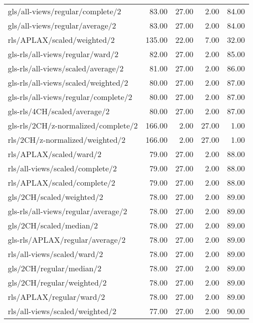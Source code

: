 \begin{longtable}{lrrrr}
    gls/all-views/regular/complete/2          &  83.00 & 27.00 &  2.00 & 84.00 \\
    gls/all-views/regular/average/2           &  83.00 & 27.00 &  2.00 & 84.00 \\
    rls/APLAX/scaled/weighted/2               & 135.00 & 22.00 &  7.00 & 32.00 \\
    gls-rls/all-views/regular/ward/2          &  82.00 & 27.00 &  2.00 & 85.00 \\
    gls-rls/all-views/scaled/average/2        &  81.00 & 27.00 &  2.00 & 86.00 \\
    gls-rls/all-views/scaled/weighted/2       &  80.00 & 27.00 &  2.00 & 87.00 \\
    gls-rls/all-views/regular/complete/2      &  80.00 & 27.00 &  2.00 & 87.00 \\
    gls-rls/4CH/scaled/average/2              &  80.00 & 27.00 &  2.00 & 87.00 \\
    gls-rls/2CH/z-normalized/complete/2       & 166.00 &  2.00 & 27.00 &  1.00 \\
    rls/2CH/z-normalized/weighted/2           & 166.00 &  2.00 & 27.00 &  1.00 \\
    rls/APLAX/scaled/ward/2                   &  79.00 & 27.00 &  2.00 & 88.00 \\
    rls/all-views/scaled/complete/2           &  79.00 & 27.00 &  2.00 & 88.00 \\
    rls/APLAX/scaled/complete/2               &  79.00 & 27.00 &  2.00 & 88.00 \\
    gls/2CH/scaled/weighted/2                 &  78.00 & 27.00 &  2.00 & 89.00 \\
    gls-rls/all-views/regular/average/2       &  78.00 & 27.00 &  2.00 & 89.00 \\
    gls/2CH/scaled/median/2                   &  78.00 & 27.00 &  2.00 & 89.00 \\
    gls-rls/APLAX/regular/average/2           &  78.00 & 27.00 &  2.00 & 89.00 \\
    rls/all-views/scaled/ward/2               &  78.00 & 27.00 &  2.00 & 89.00 \\
    gls/2CH/regular/median/2                  &  78.00 & 27.00 &  2.00 & 89.00 \\
    gls/2CH/regular/weighted/2                &  78.00 & 27.00 &  2.00 & 89.00 \\
    rls/APLAX/regular/ward/2                  &  78.00 & 27.00 &  2.00 & 89.00 \\
    rls/all-views/scaled/weighted/2           &  77.00 & 27.00 &  2.00 & 90.00 \\

\end{longtable}
